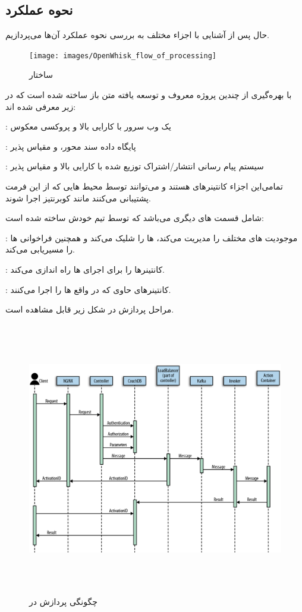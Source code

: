 \subsection{نحوه عملکرد }

حال پس از آشنایی با اجزاء مختلف  به بررسی نحوه عملکرد آن‌ها می‌پردازیم.

\begin{figure}[!h]
	\centering
	\texttt{[image: images/OpenWhisk\_flow\_of\_processing]}
	\caption{ساختار }
	\label{تصویر 2-1}
\end{figure}

 با بهره‌گیری از چندین پروژه معروف و توسعه یافته متن باز ساخته شده است که در زیر معرفی شده اند:

\textbf{} : یک وب سرور با کارایی بالا و پروکسی معکوس

\textbf{} : پایگاه داده سند محور،  و مقیاس پذیر

\textbf{} : سیستم پیام رسانی انتشار/اشتراک توزیع شده با کارایی بالا و مقیاس پذیر

تمامی‌این اجزاء کانتینرهای  هستند و می‌توانند توسط محیط هایی که از این فرمت پشتیبانی می‌کنند مانند کوبرنتیز اجرا شوند.

 شامل قسمت های دیگری می‌باشد که توسط تیم خودش ساخته شده است:

\textbf{} : موجودیت های مختلف را مدیریت می‌کند،  ها را شلیک می‌کند و همچنین فراخوانی  ها را مسیریابی می‌کند.

\textbf{} : کانتینرها را برای اجرای  ها راه اندازی می‌کند.

\textbf{} : کانتینرهای حاوی  که در واقع  ها را اجرا می‌کنند.

مراحل پردازش  در شکل زیر قابل مشاهده است.

\begin{figure}[!h]
	\centering
	\includegraphics[height=12cm]{images/action_invokation_timeline}
	\caption{چگونگی پردازش  در }
	\label{تصویر 2-1}
\end{figure}

